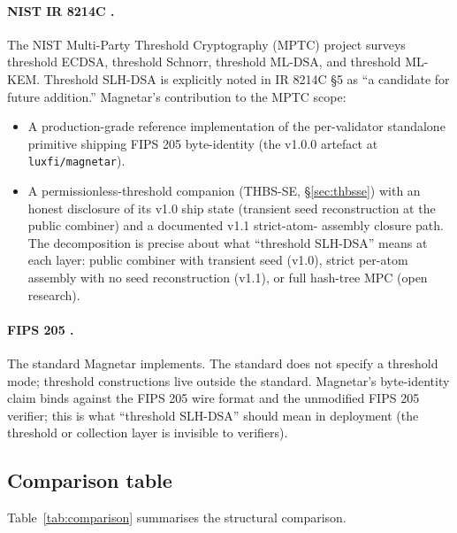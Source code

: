 \paragraph{NIST IR 8214C \cite{nistir8214c}.} The NIST Multi-Party
Threshold Cryptography (MPTC) project surveys threshold ECDSA,
threshold Schnorr, threshold ML-DSA, and threshold ML-KEM.
Threshold SLH-DSA is explicitly noted in IR 8214C \S 5 as ``a
candidate for future addition.'' Magnetar's contribution to the
MPTC scope:
\begin{itemize}[nosep,leftmargin=2em]
  \item A production-grade reference implementation of the
        per-validator standalone primitive shipping FIPS 205
        byte-identity (the v1.0.0 artefact at
        \texttt{luxfi/magnetar}).
  \item A permissionless-threshold companion (THBS-SE,
        \S\ref{sec:thbsse}) with an honest disclosure of its
        v1.0 ship state (transient seed reconstruction at the
        public combiner) and a documented v1.1 strict-atom-
        assembly closure path. The decomposition is precise
        about what ``threshold SLH-DSA'' means at each layer:
        public combiner with transient seed (v1.0), strict
        per-atom assembly with no seed reconstruction (v1.1),
        or full hash-tree MPC (open research).
\end{itemize}

\paragraph{FIPS 205 \cite{fips205}.} The standard Magnetar
implements. The standard does not specify a threshold mode;
threshold constructions live outside the standard. Magnetar's
byte-identity claim binds against the FIPS 205 wire format and
the unmodified FIPS 205 verifier; this is what ``threshold
SLH-DSA'' should mean in deployment (the threshold or
collection layer is invisible to verifiers).

\subsection{Comparison table}
\label{sec:related:table}

Table~\ref{tab:comparison} summarises the structural comparison.

